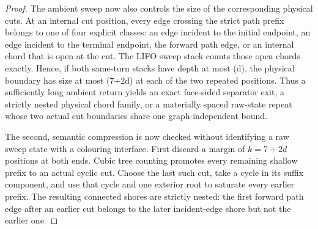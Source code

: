 \begin{proof}
The ambient sweep now also controls the size of the corresponding physical
cuts.  At an internal cut position, every edge crossing the strict path
prefix belongs to one of four explicit classes: an edge incident to the
initial endpoint, an edge incident to the terminal endpoint, the forward
path edge, or an internal chord that is open at the cut.  The LIFO sweep
stack counts those open chords exactly.  Hence, if both same-turn stacks have
depth at most (d), the physical boundary has size at most (7+2d) at each
of the two repeated positions.
Thus a sufficiently long ambient return yields an exact face-sided separator
exit, a strictly nested physical chord family, or a materially spaced
raw-state repeat whose two actual cut boundaries share one graph-independent
bound.

The second, semantic compression is now checked without identifying a raw
sweep state with a colouring interface.  First discard a margin of
\(k=7+2d\) positions at both ends.  Cubic tree counting promotes every
remaining shallow prefix to an actual cyclic cut.  Choose the last such cut,
take a cycle in its suffix component, and use that cycle and one exterior root
to saturate every earlier prefix.  The resulting connected shores are
strictly nested: the first forward path edge after an earlier cut belongs to
the later incident-edge shore but not the earlier one.


\end{proof}
